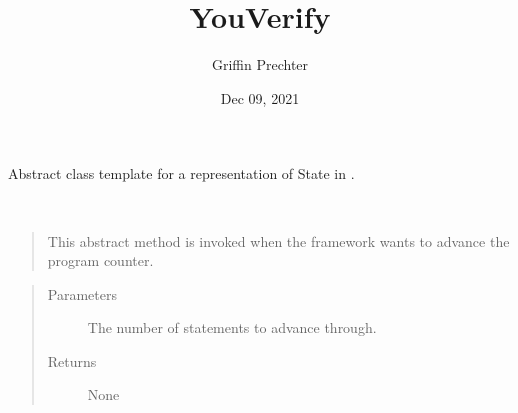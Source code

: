 \documentclass[letterpaper,10pt,english]{sphinxmanual}
\title{YouVerify}
\date{Dec 09, 2021}
\author{Griffin Prechter}
\begin{document}
\pagestyle{empty}
\sphinxmaketitle
\pagestyle{plain}
\sphinxtableofcontents
\pagestyle{normal}
\label{\detokenize{index::doc}}


\begin{fulllineitems}
\label{\detokenize{index:State.State}}
\sphinxAtStartPar
Abstract class template for a representation of State in .

\begin{fulllineitems}
\label{\detokenize{index:State.State.advance_pc}}~\begin{quote}

\sphinxAtStartPar
This abstract method is invoked when the framework wants to advance the program counter.
\end{quote}
\begin{quote}\begin{description}
\item[{Parameters}] \leavevmode
\sphinxAtStartPar
{} \textendash{} The number of statements to advance through.

\item[{Returns}] \leavevmode
\sphinxAtStartPar
None

\end{description}\end{quote}

\end{fulllineitems}


\begin{fulllineitems}
\label{\detokenize{index:State.State.assume}}~\begin{quote}


\end{quote}
\end{fulllineitems}
\end{fulllineitems}
\end{document}
